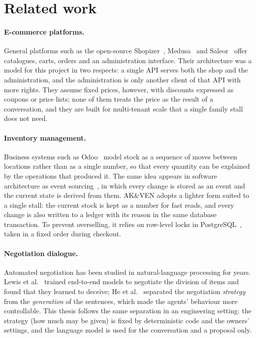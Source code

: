 \section{Related work}
\label{sec:related}

\paragraph{E-commerce platforms.} General platforms such as the open-source Shopizer~\cite{shopizer},
Medusa~\cite{medusa} and Saleor~\cite{saleor} offer catalogues, carts, orders and an administration interface. Their
architecture was a model for this project in two respects: a single API serves both the shop and the administration,
and the administration is only another client of that API with more rights. They assume fixed prices, however, with
discounts expressed as coupons or price lists; none of them treats the price as the result of a conversation, and they
are built for multi-tenant scale that a single family stall does not need.

\paragraph{Inventory management.} Business systems such as Odoo~\cite{odoo} model stock as a sequence of moves between
locations rather than as a single number, so that every quantity can be explained by the operations that produced it.
The same idea appears in software architecture as event sourcing~\cite{fowlereventsourcing}, in which every change is
stored as an event and the current state is derived from them. AK\&VEN adopts a lighter form suited to a single stall:
the current stock is kept as a number for fast reads, and every change is also written to a ledger with its reason in
the same database transaction. To prevent overselling, it relies on row-level locks in PostgreSQL~\cite{pglocking},
taken in a fixed order during checkout.

\paragraph{Negotiation dialogue.} Automated negotiation has been studied in natural-language processing for years.
Lewis et al.~\cite{lewis2017deal} trained end-to-end models to negotiate the division of items and found that they
learned to deceive; He et al.~\cite{he2018decoupling} separated the negotiation \emph{strategy} from the
\emph{generation} of the sentences, which made the agents' behaviour more controllable. This thesis follows the same
separation in an engineering setting: the strategy (how much may be given) is fixed by deterministic code and the
owners' settings, and the language model is used for the conversation and a proposal only.

